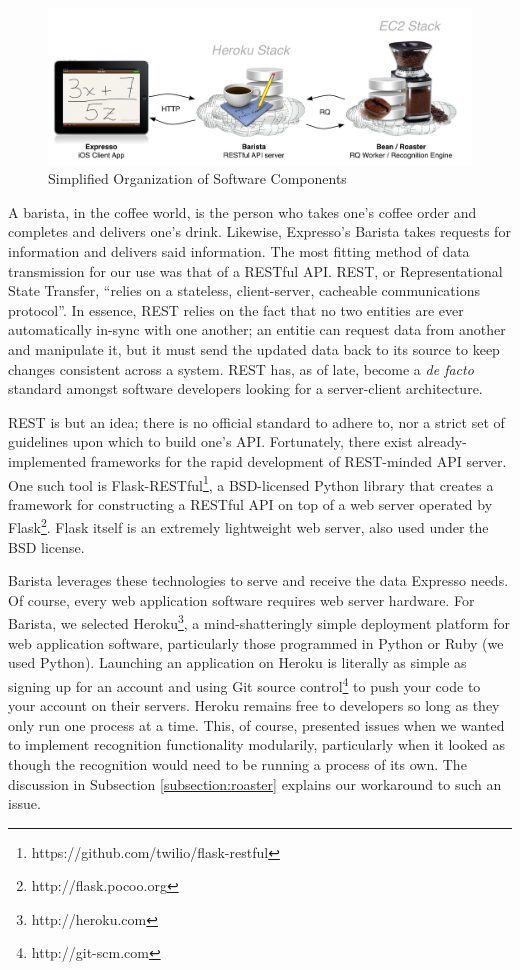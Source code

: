 \documentclass{acm_proc_article-sp}
\begin{document}
\begin{figure}
\centering
\includegraphics[width=1.0\textwidth]{final_chart.pdf}
\caption{Simplified Organization of Software Components}
\label{fig:final_chart}
\end{figure}

A barista, in the coffee world, is the person who takes one's coffee order and completes and delivers one's drink. Likewise, Expresso's Barista takes requests for information and delivers said information. The most fitting method of data transmission for our use was that of a RESTful API. REST, or Representational State Transfer, ``relies on a stateless, client-server, cacheable communications protocol''\cite{elkstein_rest_2008}. In essence, REST relies on the fact that no two entities are ever automatically in-sync with one another; an entitie can request data from another and manipulate it, but it must send the updated data back to its source to keep changes consistent across a system. REST has, as of late, become a \emph{de facto} standard amongst software developers looking for a server-client architecture. 

REST is but an idea; there is no official standard to adhere to, nor a strict set of guidelines upon which to build one's API. Fortunately, there exist already-implemented frameworks for the rapid development of REST-minded API server. One such tool is Flask-RESTful\footnote{https://github.com/twilio/flask-restful}, a BSD-licensed Python library that creates a framework for constructing a RESTful API on top of a web server operated by Flask\footnote{http://flask.pocoo.org}. Flask itself is an extremely lightweight web server, also used under the BSD license.

Barista leverages these technologies to serve and receive the data Expresso needs. Of course, every web application software requires web server hardware. For Barista, we selected Heroku\footnote{http://heroku.com}, a mind-shatteringly simple deployment platform for web application software, particularly those programmed in Python or Ruby (we used Python). Launching an application on Heroku is literally as simple as signing up for an account and using Git source control\footnote{http://git-scm.com} to push your code to your account on their servers. Heroku remains free to developers so long as they only run one process at a time. This, of course, presented issues when we wanted to implement recognition functionality modularily, particularly when it looked as though the recognition would need to be running a process of its own. The discussion in Subsection \ref{subsection:roaster} explains our workaround to such an issue.
\end{document}
